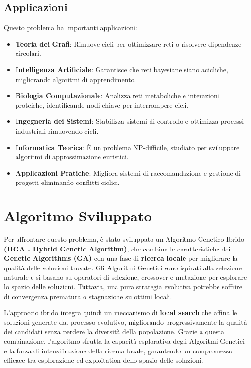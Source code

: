 \documentclass[a4paper,12pt]{article}
\begin{document}
\subsection{Applicazioni}
Questo problema ha importanti applicazioni:
\begin{itemize}
    \item \textbf{Teoria dei Grafi}: Rimuove cicli per ottimizzare reti o risolvere dipendenze circolari.
    \item \textbf{Intelligenza Artificiale}: Garantisce che reti bayesiane siano acicliche, migliorando algoritmi di apprendimento.
    \item \textbf{Biologia Computazionale}: Analizza reti metaboliche e interazioni proteiche, identificando nodi chiave per interrompere cicli.
    \item \textbf{Ingegneria dei Sistemi}: Stabilizza sistemi di controllo e ottimizza processi industriali rimuovendo cicli.
    \item \textbf{Informatica Teorica}: È un problema NP-difficile, studiato per sviluppare algoritmi di approssimazione euristici.
    \item \textbf{Applicazioni Pratiche}: Migliora sistemi di raccomandazione e gestione di progetti eliminando conflitti ciclici.
\end{itemize}



\section{Algoritmo Sviluppato}
Per affrontare questo problema, è stato sviluppato un Algoritmo Genetico Ibrido \textbf{(HGA - Hybrid Genetic Algorithm)}, che combina le caratteristiche dei \textbf{Genetic Algorithms (GA)} con una fase di \textbf{ricerca locale} per migliorare la qualità delle soluzioni trovate. Gli Algoritmi Genetici sono ispirati alla selezione naturale e si basano su operatori di selezione, crossover e mutazione per esplorare lo spazio delle soluzioni. Tuttavia, una pura strategia evolutiva potrebbe soffrire di convergenza prematura o stagnazione su ottimi locali.

L'approccio ibrido integra quindi un meccanismo di \textbf{local search} che affina le soluzioni generate dal processo evolutivo, migliorando progressivamente la qualità dei candidati senza perdere la diversità della popolazione. Grazie a questa combinazione, l'algoritmo sfrutta la capacità esplorativa degli Algoritmi Genetici e la forza di intensificazione della ricerca locale, garantendo un compromesso efficace tra esplorazione ed exploitation dello spazio delle soluzioni.
\end{document}

